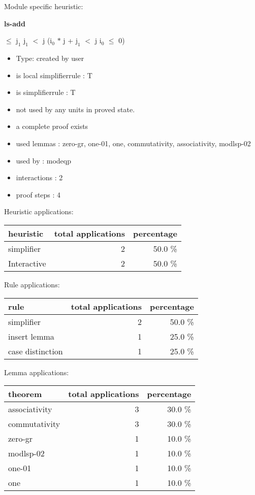\documentclass[a4paper]{article}
\begin{document}
Module specific heuristic:

\pagebreak

{\LARGE\bf ls-add}\label{lemma-ls-add}

\medskip

  $\le$ $\mbox{j}_{1}$ \And $\mbox{j}_{1}$ $<$ j \Imp ($\mbox{i}_{0}$ $*$ j + $\mbox{j}_{1}$ $<$ j \Equiv $\mbox{i}_{0}$ $\le$ 0)

\begin{itemize}

\item Type: created by user

\item is local simplifierrule : T
\item is simplifierrule : T
\item not used by any units in proved state.
\item       a complete proof exists
\item       used lemmas  : zero-gr, one-01, one, commutativity, associativity, modlsp-02
\item       used by      : modeqp
\item       interactions : 2
\item       proof steps  : 4
\end{itemize}

\medskip


Heuristic applications:

\begin{supertabular}{l|r|r}
heuristic	& total applications & percentage \\ \hline
simplifier & 2 & 50.0 \% \\
Interactive & 2 & 50.0 \% \\

\end{supertabular}

Rule applications:

\begin{supertabular}{l|r|r}
rule	        & total applications & percentage \\ \hline
simplifier & 2 & 50.0 \% \\
insert lemma & 1 & 25.0 \% \\
case distinction & 1 & 25.0 \% \\

\end{supertabular}

Lemma applications:

\begin{supertabular}{l|r|r}
theorem	        & total applications & percentage \\ \hline
associativity & 3 & 30.0 \% \\
commutativity & 3 & 30.0 \% \\
zero-gr & 1 & 10.0 \% \\
modlsp-02 & 1 & 10.0 \% \\
one-01 & 1 & 10.0 \% \\
one & 1 & 10.0 \% \\

\end{supertabular}
\end{document}
